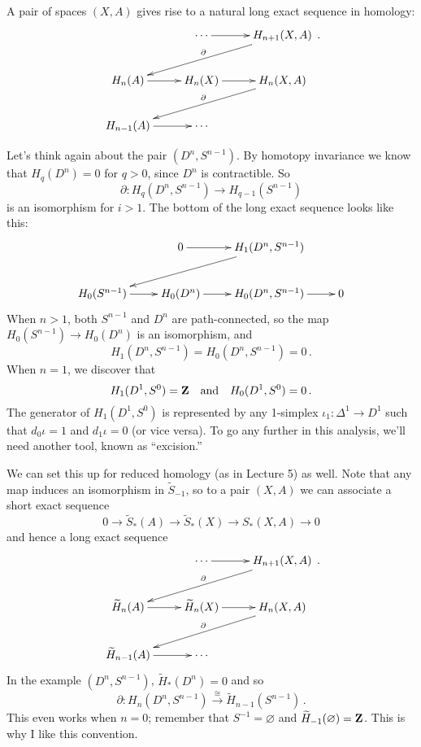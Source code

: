 \begin{example} A pair of spaces $(X,A)$ gives rise to a natural long exact 
sequence in homology:
\begin{equation*}
\xymatrix{ 
& \cdots \ar[r] & H_{n+1}(X,A) \ar[dll]_\partial\\
 H_n(A)\ar[r] & H_n(X)\ar[r] & H_n(X,A)\ar[dll]_\partial\\
 H_{n-1}(A)\ar[r] & \cdots & 
}\,.
\end{equation*}
\end{example}

\begin{example} Let's think again about the pair $(D^n,S^{n-1})$. By homotopy invariance we know that $H_q(D^n)=0$ for $q>0$, since $D^n$ is contractible. So 
\[
\partial:H_q(D^n,S^{n-1})\to H_{q-1}(S^{n-1})
\] 
is an isomorphism for $i>1$. The bottom of the long exact sequence looks like 
this: 
\[
\xymatrix{
& 0 \ar[r] & H_1(D^n,S^{n-1}) \ar[lld] \\
H_0(S^{n-1}) \ar[r] & H_0(D^n) \ar[r] & H_0(D^n,S^{n-1}) \ar[r] & 0
}\]
When $n>1$, both $S^{n-1}$ and $D^n$ are path-connected, so the map
$H_0(S^{n-1})\to H_0(D^n)$ is an isomorphism, and 
\[
H_1(D^n,S^{n-1})=H_0(D^n,S^{n-1})=0\,.
\]
When $n=1$, we discover that
\[
H_1(D^1,S^0)=\mathbf{Z} \quad\hbox{and}\quad H_0(D^1,S^0)=0\,.
\]
The generator of $H_1(D^1,S^0)$ is represented by any 1-simplex 
$\iota_1:\Delta^1\to D^1$ such that $d_0\iota=1$ and $d_1\iota=0$ (or vice 
versa). 
To go any further in this analysis, we'll need another tool, known as
``excision.'' 
\end{example}

We can set this up for reduced homology (as in Lecture 5) as well. 
Note that any map induces an isomorphism in $\widetilde S_{-1}$, so to
a pair $(X,A)$ we can associate a short exact sequence
\[
0\to\widetilde S_*(A)\to\widetilde S_*(X)\to S_*(X,A)\to0
\]
and hence a long exact sequence 
\begin{equation*}
\xymatrix{ 
& \cdots \ar[r] & H_{n+1}(X,A)\ar[dll]_\partial\\
\widetilde H_n(A)\ar[r] & \widetilde H_n(X)\ar[r] & H_n(X,A)\ar[dll]_\partial\\\widetilde H_{n-1}(A)\ar[r] & \cdots &
}\,.
\end{equation*}
In the example $(D^n,S^{n-1})$, $\widetilde H_*(D^n)=0$ and so 
\[
\partial:H_n(D^n,S^{n-1})\xrightarrow{\cong}\widetilde H_{n-1}(S^{n-1})\,.
\]
This even works when $n=0$; remember that $S^{-1}=\varnothing$ and 
$\widetilde H_{-1}(\varnothing)=\mathbf Z$. This is why I like this convention.

